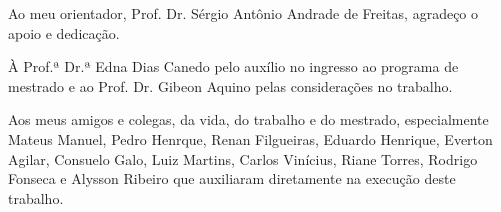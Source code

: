 Ao meu orientador, Prof. Dr. Sérgio Antônio Andrade de Freitas, agradeço o apoio e dedicação.

À Prof.ª Dr.ª Edna Dias Canedo pelo auxílio no ingresso ao programa de mestrado e ao Prof. Dr. Gibeon Aquino pelas considerações no trabalho.

Aos meus amigos e colegas, da vida, do trabalho e do mestrado, especialmente Mateus Manuel, Pedro Henrque, Renan Filgueiras, Eduardo Henrique, Everton Agilar, Consuelo Galo, Luiz Martins, Carlos Vinícius, Riane Torres, Rodrigo Fonseca e Alysson Ribeiro que auxiliaram diretamente na execução deste trabalho. 